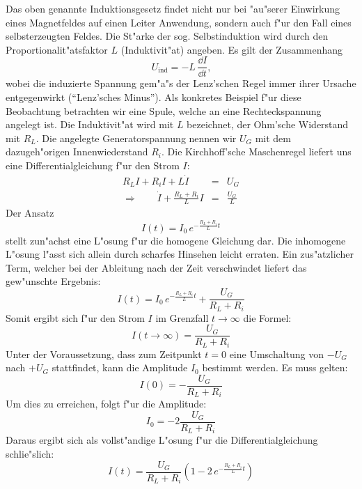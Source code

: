 \documentclass[a4paper,10pt]{article}
\begin{document}
Das oben genannte Induktionsgesetz findet nicht nur bei "au"serer Einwirkung eines Magnetfeldes auf einen Leiter Anwendung, sondern auch f"ur den Fall eines selbsterzeugten Feldes. Die St"arke der sog. Selbstinduktion wird durch den Proportionalit"atsfaktor $L$ (Induktivit"at) angeben. Es gilt der Zusammenhang
\begin{equation}
U_\text{ind} = - L \, \frac{\dd I}{\dd t} \text{,}
\end{equation}
wobei die induzierte Spannung gem"a"s der Lenz'schen Regel immer ihrer Ursache entgegenwirkt ("`Lenz'sches Minus"'). Als konkretes Beispiel f"ur diese Beobachtung betrachten wir eine Spule, welche an eine Rechteckspannung angelegt ist. Die Induktivit"at wird mit $L$ bezeichnet, der Ohm'sche Widerstand mit $R_L$. Die angelegte Generatorspannung nennen wir $U_G$ mit dem dazugeh"origen Innenwiederstand $R_i$. Die Kirchhoff'sche Maschenregel liefert uns eine Differentialgleichung f"ur den Strom $I$:
\begin{eqnarray}
R_L I + R_i I + L \dot{I} &=& U_G \nonumber \\
\Rightarrow \qquad \dot{I} + \frac{R_L + R_i}{L} I &=&  \frac{U_G}{L}
\end{eqnarray}
Der Ansatz
\begin{equation}
I(t) = I_0 \, e^{- \frac{R_L + R_i}{L} t}
\end{equation}
stellt zun"achst eine L"osung f"ur die homogene Gleichung dar. Die inhomogene L"osung l"asst sich allein durch scharfes Hinsehen leicht erraten. Ein zus"atzlicher Term, welcher bei der Ableitung nach der Zeit verschwindet liefert das gew"unschte Ergebnis:
\begin{equation}
I(t) = I_0 \, e^{- \frac{R_L + R_i}{L} t} + \frac{U_G}{R_L + R_i}
\end{equation}
Somit ergibt sich f"ur den Strom $I$ im Grenzfall $t \rightarrow \infty$ die Formel:
\begin{equation}
I(t \rightarrow \infty) = \frac{U_G}{R_L + R_i}
\end{equation}
Unter der Voraussetzung, dass zum Zeitpunkt $t=0$ eine Umschaltung von $-U_G$ nach $+U_G$ stattfindet, kann die Amplitude $I_0$ bestimmt werden. Es muss gelten:
\begin{equation}
I(0) = - \frac{U_G}{R_L + R_i}
\end{equation}
Um dies zu erreichen, folgt f"ur die Amplitude:
\begin{equation}
I_0 = - 2 \frac{U_G}{R_L + R_i}
\end{equation}
Daraus ergibt sich als vollst"andige L"osung f"ur die Differentialgleichung schlie"slich:
\begin{equation}
I(t) = \frac{U_G}{R_L + R_i} \left(1 - 2 \, e^{- \frac{R_L + R_i}{L} t} \right)
\end{equation}
\end{document}
